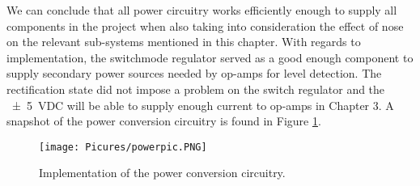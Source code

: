 We can conclude that all power circuitry works efficiently enough to supply all components in the project when also taking into consideration the effect of nose on the relevant sub-systems mentioned in this chapter. With regards to implementation, the switchmode regulator served as a good enough component to supply secondary power sources needed by op-amps for level detection. The rectification state did not impose a problem on the switch regulator and the \SI{+-5}{VDC} will be able to supply enough current to op-amps in Chapter 3. A snapshot of the power conversion circuitry is found in Figure \ref{subfig:pwr_pcb}.
    
\begin{figure}[H]
    \centering
  	\texttt{[image: Picures/powerpic.PNG]}
	\caption{Implementation of the power conversion circuitry. } \label{subfig:pwr_pcb}
 \end{figure}

